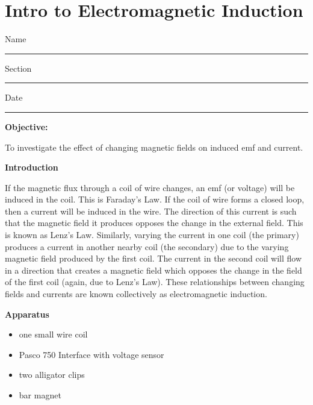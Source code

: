 \setcounter{equation}{0}
\setcounter{figure}{0}

\section{Intro to Electromagnetic Induction}

Name \rule{2.0in}{0.1pt}\hfill{}Section \rule{1.0in}{0.1pt}\hfill{}Date
\rule{1.0in}{0.1pt}

\textbf{Objective:}

To investigate the effect of changing magnetic fields on induced emf and current.

\textbf{Introduction} 

If the magnetic flux through a coil of wire changes, an emf (or voltage) 
will be induced in the coil. This is Faraday's Law. If the coil of wire 
forms a closed loop, then a current will be induced in the wire. The direction 
of this current is such that the magnetic field it produces opposes the change 
in the external field. This is known as Lenz's Law. Similarly, varying the 
current in one coil (the primary) produces a current in another nearby coil 
(the secondary) due to the varying magnetic field produced by the first coil. 
The current in the second coil will flow in a direction that creates a magnetic
field which opposes the change in the field of the first coil (again, due to 
Lenz's Law). These relationships between changing fields and currents are known 
collectively as electromagnetic induction.

\textbf{Apparatus} 

\begin{itemize}%
\setlength\itemsep{-4pt}
\setlength\topsep{-6pt}
\setlength\partopsep{-6pt}
\vspace{-0.2in}  

\item one small wire coil
\item Pasco 750 Interface with voltage sensor
\item two alligator clips
\item bar magnet
\end{itemize}
\vspace{-0.1in}  


